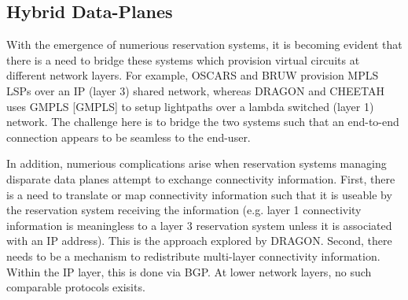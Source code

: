 \documentclass[conference]{IEEEtran}
\begin{document}
\subsection{Hybrid Data-Planes}
With the emergence of numerious reservation systems, it is becoming evident 
that there is a need to bridge these systems which provision virtual circuits at different network layers.
For example, OSCARS and BRUW provision MPLS LSPs over an IP (layer 3) shared network, whereas DRAGON and CHEETAH uses
GMPLS [GMPLS] to setup lightpaths over a lambda switched (layer 1) network.  The challenge here is to bridge the two systems such
that an end-to-end connection appears to be seamless to the end-user.

In addition, numerious complications arise when reservation systems managing disparate data planes attempt to exchange connectivity information.  First, there is a need to translate or map  connectivity information such that it is useable by the reservation system receiving the information (e.g. layer 1 connectivity information is meaningless to a layer 3 reservation system unless it is associated with an IP address).  This is the approach explored by DRAGON.  Second, there needs to be a mechanism to redistribute multi-layer connectivity information. Within the IP layer, this is done via BGP.  At lower network layers, no such comparable protocols exisits.


%


%
\end{document}
